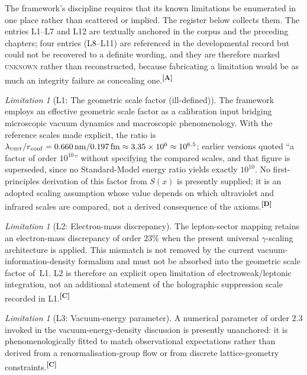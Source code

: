 \documentclass[12pt,a4paper,twoside]{article}
\theoremstyle{plain}
\theoremstyle{definition}
\theoremstyle{remark}
\newtheorem{limitation}[theorem]{Limitation}
\newcommand{\UIDT}{\textsc{uidt}}
\newcommand{\catmark}[1]{\textsuperscript{\textsf{\textbf{[#1]}}}}
\newcommand{\Sx}{S(x)}
\begin{document}
The framework's discipline requires that its known limitations be enumerated in one place rather than scattered or implied. The register below collects them. The entries L1--L7 and L12 are textually anchored in the corpus and the preceding chapters; four entries (L8--L11) are referenced in the developmental record but could not be recovered to a definite wording, and they are therefore marked \textsc{unknown} rather than reconstructed, because fabricating a limitation would be as much an integrity failure as concealing one.\catmark{A}

\begin{limitation}[L1: The geometric scale factor (ill-defined)]
\label{lim:L1}
The framework employs an effective geometric scale factor as a calibration input bridging microscopic vacuum dynamics and macroscopic phenomenology. With the reference scales made explicit, the ratio is $\lambda_{\UIDT}/r_{\mathrm{conf}} = 0.660\,\mathrm{nm}/0.197\,\mathrm{fm} \approx 3.35\times10^{6} \approx 10^{6.5}$; earlier versions quoted ``a factor of order $10^{10}$'' without specifying the compared scales, and that figure is superseded, since no Standard-Model energy ratio yields exactly $10^{10}$. No first-principles derivation of this factor from $\Sx$ is presently supplied; it is an adopted scaling assumption whose value depends on which ultraviolet and infrared scales are compared, not a derived consequence of the axioms.\catmark{D}
\end{limitation}

\begin{limitation}[L2: Electron-mass discrepancy]
\label{lim:L2}
The lepton-sector mapping retains an electron-mass discrepancy of order $23\%$ when the present universal $\gamma$-scaling architecture is applied. This mismatch is not removed by the current vacuum-information-density formalism and must not be absorbed into the geometric scale factor of~L1. L2 is therefore an explicit open limitation of electroweak/leptonic integration, not an additional statement of the holographic suppression scale recorded in L1.\catmark{C}
\end{limitation}

\begin{limitation}[L3: Vacuum-energy parameter]
\label{lim:L3}
A numerical parameter of order $2.3$ invoked in the vacuum-energy-density discussion is presently unanchored: it is phenomenologically fitted to match observational expectations rather than derived from a renormalisation-group flow or from discrete lattice-geometry constraints.\catmark{C}
\end{limitation}
\end{document}
